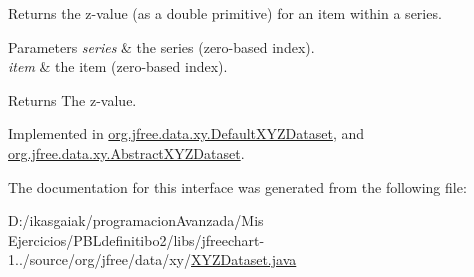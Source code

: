 Returns the z-\/value (as a double primitive) for an item within a series.


\begin{DoxyParams}{Parameters}
{\em series} & the series (zero-\/based index). \\
\hline
{\em item} & the item (zero-\/based index).\\
\hline
\end{DoxyParams}
\begin{DoxyReturn}{Returns}
The z-\/value. 
\end{DoxyReturn}


Implemented in \mbox{\hyperlink{classorg_1_1jfree_1_1data_1_1xy_1_1_default_x_y_z_dataset_a629e54a55e3affb5ff0e1151df651068}{org.\+jfree.\+data.\+xy.\+Default\+X\+Y\+Z\+Dataset}}, and \mbox{\hyperlink{classorg_1_1jfree_1_1data_1_1xy_1_1_abstract_x_y_z_dataset_a797ce912ff2711ef1627c21db6ff50a7}{org.\+jfree.\+data.\+xy.\+Abstract\+X\+Y\+Z\+Dataset}}.



The documentation for this interface was generated from the following file\+:\begin{DoxyCompactItemize}
\item 
D\+:/ikasgaiak/programacion\+Avanzada/\+Mis Ejercicios/\+P\+B\+Ldefinitibo2/libs/jfreechart-\/1../source/org/jfree/data/xy/\mbox{\hyperlink{_x_y_z_dataset_8java}{X\+Y\+Z\+Dataset.\+java}}\end{DoxyCompactItemize}
